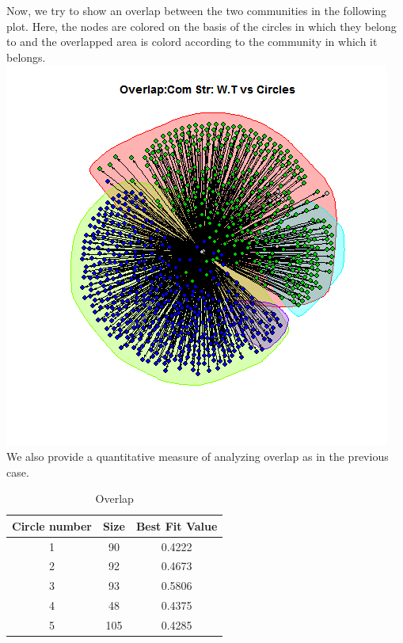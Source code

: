 \documentclass{article}
\begin{document}
\begin{enumerate}
 Now, we try to show an overlap between the two communities in the following plot.
Here, the nodes are colored on the basis of the circles in which they belong to and 
the overlapped area is colord according to the community in which it belongs.\\
 \includegraphics[scale=0.7]{7h} \\
 
 We also provide a quantitative measure of analyzing overlap as in the previous case.
\begin{table}[ht]
\caption{Overlap}
\centering
\begin{tabular}{|c |c |c |}
\hline\hline
\newline

Circle number & Size & Best Fit Value \\ [0.5ex]
\hline

1 & 90 & 0.4222 \\
\hline
2 & 92 & 0.4673 \\
\hline
3 & 93 & 0.5806 \\
\hline
4 & 48 & 0.4375 \\
\hline
5 & 105 & 0.4285 \\
\hline
\end{tabular}
\end{table} 
\end{enumerate}
\end{document}
